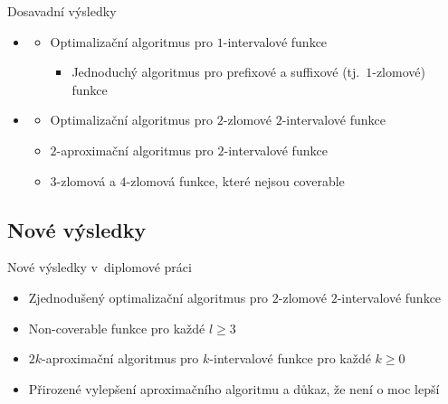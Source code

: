 \documentclass{beamer}
\theoremstyle{remark}
\begin{document}
\begin{frame}{Dosavadní výsledky}


\begin{itemize}
\item \citet{Schieber2005154}
\begin{itemize}
\item
Optimalizační algoritmus pro $1$-intervalové funkce
\begin{itemize}
\item Jednoduchý algoritmus pro prefixové a suffixové (tj.~$1$-zlomové) funkce
\end{itemize}
\end{itemize}

\item \citet{Dubovsky2012}
\begin{itemize}
\item
Optimalizační algoritmus pro $2$-zlomové $2$-intervalové funkce

\item
$2$-aproximační algoritmus pro $2$-intervalové funkce

\item $3$-zlomová a $4$-zlomová funkce,
které nejsou coverable
\end{itemize}
\end{itemize}

\end{frame}

\subsection{Nové výsledky}

\begin{frame}{Nové výsledky v~diplomové práci}
\begin{itemize}
\item Zjednodušený optimalizační algoritmus pro $2$-zlomové $2$-intervalové funkce
\item Non-coverable funkce pro každé $l \geq 3$
\item $2k$-aproximační algoritmus pro $k$-intervalové funkce pro každé $k \geq 0$
\item Přirozené vylepšení aproximačního algoritmu a důkaz, že není o moc lepší
\end{itemize}
\end{frame}
\end{document}

